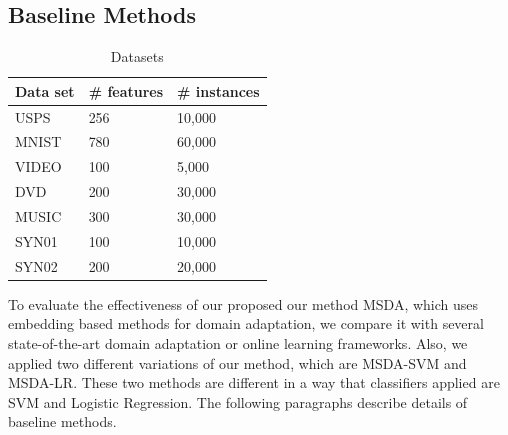 \subsection{Baseline Methods}

\begin{table}
\centering
  \caption{Datasets}
  \begin{tabular}{|l|l|l|}
    \hline
    Data set & \# features & \# instances\\ \hline
    USPS & 256 & 10,000\\ \hline
    MNIST & 780 & 60,000\\ \hline
    VIDEO & 100 & 5,000\\ \hline
    DVD & 200 & 30,000\\ \hline
    MUSIC & 300 & 30,000\\ \hline
    SYN01 & 100 & 10,000\\ \hline
    SYN02 & 200 & 20,000\\ \hline
    
\end{tabular}
\label{tbl:datasets}
\end{table}

\begin{table}[t]
\centering
\caption{Comparison of performance}
\label{tbl:performance}
\end{table}

To evaluate the effectiveness of our proposed our method MSDA, which uses embedding based methods for domain adaptation, we compare it with several state-of-the-art domain adaptation or online learning frameworks. Also, we applied two different variations of our method, which are MSDA-SVM and MSDA-LR. These two methods are different in a way that classifiers applied are SVM and Logistic Regression. The following paragraphs describe details of baseline methods.

